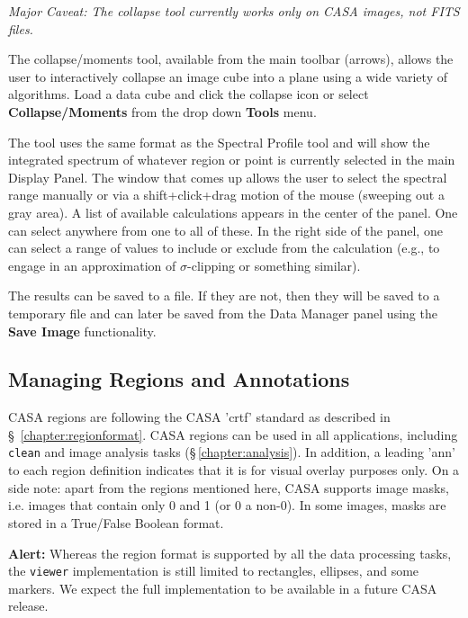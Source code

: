 {\em Major Caveat: The collapse tool currently works only on CASA images, not FITS files.}

The collapse/moments tool, available from the main toolbar (arrows), allows the user
to interactively collapse an image cube into a plane using a wide variety of algorithms. Load a data cube and
click the collapse icon or select {\bf Collapse/Moments} from the drop down {\bf Tools} menu.

The tool uses the same format as the Spectral Profile tool and will show the integrated spectrum of whatever region
or point is currently selected in the main Display Panel. The window that comes up allows the user to select the spectral range 
manually or via a shift+click+drag motion of the mouse (sweeping out a gray area). A list of available calculations appears in the center 
of the panel. One can select anywhere from one to all of these. In the right side of the panel, one can select a range of values to 
include or exclude from the calculation (e.g., to engage in an approximation of $\sigma$-clipping or something similar). 

The results can be saved to a file. If they are not, then they will be saved to a temporary file and can later be saved from the Data Manager
panel using the {\bf Save Image} functionality.

\subsection{Managing Regions and Annotations}
\label{section:display.image.rgnmgr}

CASA regions are following the CASA 'crtf' standard as described in
\S~\ref{chapter:regionformat}. CASA regions can be used in all
applications, including {\tt clean} and image analysis tasks
(\S\,\ref{chapter:analysis}). In addition, a leading 'ann' to each
region definition indicates that it is for visual overlay purposes
only. On a side note: apart from the regions mentioned here, CASA supports
image masks, i.e. images that contain only 0 and 1 (or 0 a non-0). In
some images, masks are stored in a True/False Boolean format. 

{\bf Alert:} Whereas the region format is supported by all the data
  processing tasks, the {\tt viewer} implementation is still limited
  to rectangles, ellipses, and some markers. We expect the full
  implementation to be available in a future CASA release. 


